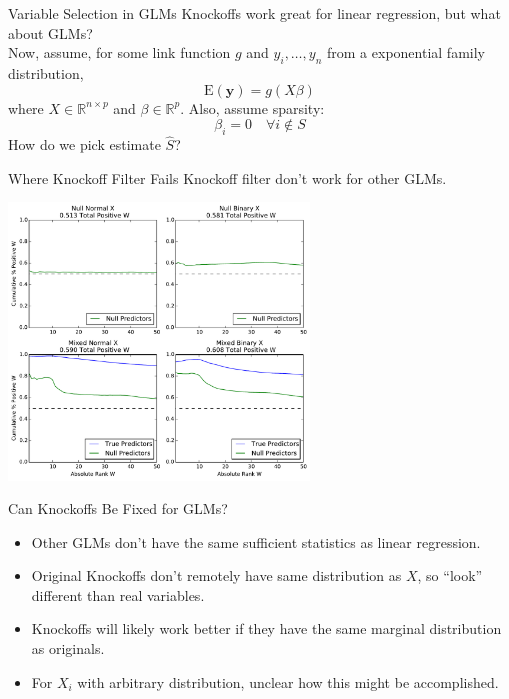 \documentclass{beamer}
\newcommand{\R}{\mathbb{R}}
\newcommand{\E}{\mathrm{E}}
\begin{document}
\begin{frame}{Variable Selection in GLMs}
    Knockoffs work great for linear regression, but what about GLMs? \\
    \vspace{1cm}
    Now, assume, for some link function $g$ and $y_i,\ldots,y_n$ from a exponential family distribution,
     \[\E(\mathbf{y}) = g(X\beta)\]
    where $X \in \R^{n\times p}$ and $\beta\in\R^p$. Also, assume sparsity:
    \[\beta_i = 0 \quad \forall i\not\in S\]
    How do we pick estimate $\hat S$?
\end{frame}

\begin{frame}{Where Knockoff Filter Fails}
    Knockoff filter don't work for other GLMs. \\
    \begin{center}
        \includegraphics[width=8cm]{images/entryrate_original_logit}
    \end{center}
\end{frame}

\begin{frame}{Can Knockoffs Be Fixed for GLMs?}
    \begin{itemize}
        \item Other GLMs don't have the same sufficient statistics as linear regression.
        \item Original Knockoffs don't remotely have same distribution as $X$, so ``look'' different than real variables.
        \item Knockoffs will likely work better if they have the same marginal distribution as originals. 
        \item For $X_i$ with arbitrary distribution, unclear how this might be accomplished.
    \end{itemize}
\end{frame}
\end{document}
